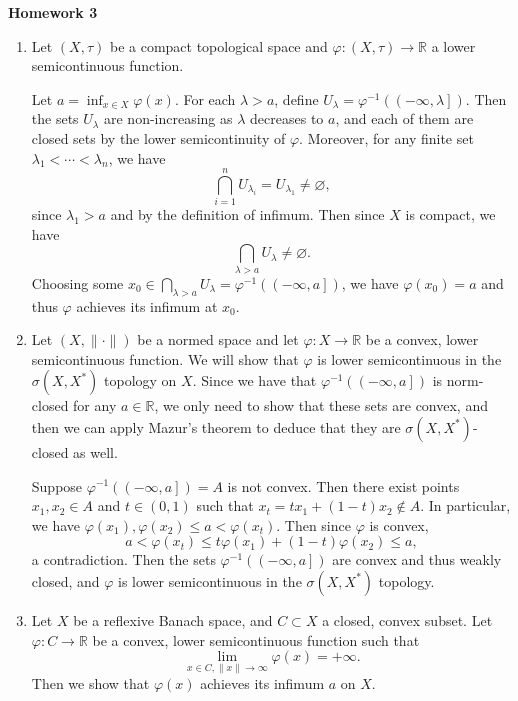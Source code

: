 \documentclass[11pt, reqno]{article}
\theoremstyle{plain}
\theoremstyle{definition}
\theoremstyle{remark}
\renewcommand{\phi}{\varphi}
\renewcommand{\emptyset}{\varnothing}
\newcommand{\RR}{\mathbb{R}}
\begin{document}
\topmargin=-40pt
\renewcommand{\headrulewidth}{1pt}
\renewcommand{\headsep}{20pt}
\thispagestyle{fancy}

{\Huge \bfseries \noindent Homework 3}

\begin{enumerate}
    \item[1.] Let $(X, \tau)$ be a compact topological space and $\phi: (X ,\tau) \rightarrow \RR$ a 
    lower semicontinuous function. 
    
    Let $a = \inf_{x \in X} \phi(x)$. For each $\lambda > a$, 
    define $U_\lambda = \phi^{-1}(\left(-\infty, \lambda\right])$. Then the sets $U_\lambda$ are non-increasing
    as $\lambda$ decreases to $a$, and each of them are closed sets by the lower semicontinuity of $\phi$.
    Moreover, for any finite set $\lambda_1 < \cdots < \lambda_n$, we have 
    \[
        \bigcap_{i = 1}^n U_{\lambda_i} = U_{\lambda_1} \neq \emptyset,
    \]
    since $\lambda_1 > a$ and by the definition of infimum. Then since $X$ is compact, we have 
    \[
        \bigcap_{\lambda > a} U_\lambda \neq \emptyset.
    \]
    Choosing some $x_0 \in \bigcap_{\lambda > a} U_\lambda = \phi^{-1}(\left(-\infty, a\right])$, we 
    have $\phi(x_0) = a$ and thus $\phi$ achieves its infimum at $x_0$.

    \item[2.] Let $(X, \|\cdot\|)$ be a normed space and let $\phi: X \rightarrow \RR$ be a convex, 
    lower semicontinuous function. We will show that $\phi$ is lower semicontinuous in the $\sigma(X, X^*)$ 
    topology on $X$. Since we have that $\phi^{-1}(\left(-\infty, a\right])$ is norm-closed 
    for any $a \in \RR$, we only need to show that these sets are convex, and then we can apply Mazur's
    theorem to deduce that they are $\sigma(X, X^*)$-closed as well. 

    Suppose $\phi^{-1}(\left(-\infty, a\right]) = A$ is not convex. Then there exist points $x_1, x_2 \in A$
    and $t \in (0,1)$ such that $x_t = tx_1 + (1-t)x_2 \notin A$. In particular, we have 
    $\phi(x_1), \phi(x_2) \leq a < \phi(x_t)$. Then since $\phi$ is convex, 
    \[
        a < \phi(x_t) \leq t\phi(x_1) + (1-t)\phi(x_2) \leq a,
    \]
    a contradiction. Then the sets $\phi^{-1}(\left(-\infty, a\right])$ are convex and thus weakly closed, 
    and $\phi$ is lower semicontinuous in the $\sigma(X, X^*)$ topology. 

    \item[3.] Let $X$ be a reflexive Banach space, and $C \subset X$ a closed, convex subset. Let 
    $\phi: C \rightarrow \RR$ be a convex, lower semicontinuous function such that 
    \[
        \lim_{x \in C, \|x\| \rightarrow \infty} \phi(x) = + \infty.
    \]
    Then we show that $\phi(x)$ achieves its infimum $a$ on $X$. 


\end{enumerate}
\end{document}
